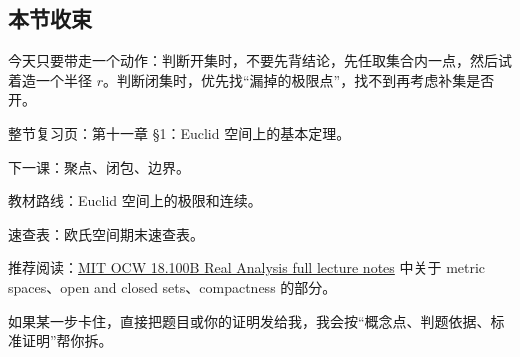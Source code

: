 \subsection*{本节收束}

今天只要带走一个动作：判断开集时，不要先背结论，先任取集合内一点，然后试着造一个半径 \(r\)。判断闭集时，优先找“漏掉的极限点”，找不到再考虑补集是否开。

整节复习页：第十一章 §1：Euclid 空间上的基本定理。

下一课：聚点、闭包、边界。

教材路线：Euclid 空间上的极限和连续。

速查表：欧氏空间期末速查表。

推荐阅读：\href{https://ocw.mit.edu/courses/18-100b-real-analysis-spring-2025/mit18_100b_s25_lec_full.pdf}{MIT OCW 18.100B Real Analysis full lecture notes} 中关于 metric spaces、open and closed sets、compactness 的部分。

如果某一步卡住，直接把题目或你的证明发给我，我会按“概念点、判题依据、标准证明”帮你拆。
